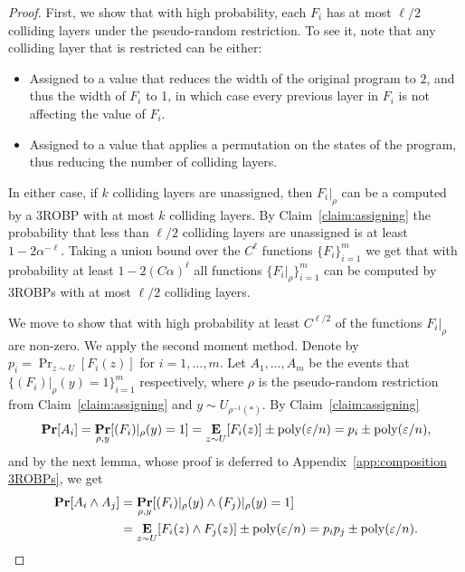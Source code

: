 \begin{proof}
	First, we show that with high probability, each $F_i$ has at most $\ell/2$ colliding layers under the pseudo-random restriction. 
	To see it, note that any colliding layer that is restricted can be either:
	\begin{itemize}
		\item Assigned to a value that reduces the width of the original program to $2$, and thus the width of $F_i$ to 1, in which case every previous layer in $F_i$ is not affecting the value of $F_i$.
		\item Assigned to a value that applies a permutation on the states of the program, thus reducing the number of colliding layers.
	\end{itemize}  
	In either case, if $k$ colliding layers are unassigned, then $F_i|_{\rho}$ can be a computed by a 3ROBP with at most $k$ colliding layers.
	By Claim~\ref{claim:assigning} the probability that less than $\ell/2$ colliding layers are unassigned is at least $1- 2 \alpha^{-\ell}$.
	Taking a union bound over the $C^{\ell}$ functions $\{F_i\}_{i=1}^{m}$ we get that with probability at least $1-2 (C \alpha)^{\ell}$ all functions $\{F_i|_{\rho}\}_{i=1}^{m}$ can be computed by 3ROBPs with at most $\ell/2$ colliding layers.
	
	We move to show that with high probability at least $C^{\ell/2}$ of the functions $F_i|_{\rho}$ are non-zero.
	We apply the second moment method. 
	Denote by $p_i = \Pr_{z\sim U}[F_i(z)]$ for $i=1, \ldots, m$.
	Let $A_1, \ldots, A_m$ be the events that $\{(F_i)|_{\rho}(y) =1\}_{i=1}^{m}$ respectively, where $\rho$ is the pseudo-random restriction from Claim~\ref{claim:assigning} and $y \sim U_{\rho^{-1}(*)}$.
	By Claim~\ref{claim:assigning}
	$$\mathop{\bf Pr\/}[A_i] = \mathop{\bf Pr\/}_{\rho,y}[(F_i)|_{\rho}(y) =1] = \mathop{\bf E\/}_{z\sim U}[F_i(z)] \pm {\mathrm{poly}}(\varepsilon/n) = p_i \pm {\mathrm{poly}}(\varepsilon/n),$$
	and by the next lemma, whose proof is deferred to Appendix~\ref{app:composition 3ROBPs}, we get
	\begin{align*}\mathop{\bf Pr\/}[A_i \wedge A_j] &= \mathop{\bf Pr\/}_{\rho,y}[(F_i)|_{\rho}(y) \wedge (F_j)|_{\rho}(y) =1]\\
	&= \mathop{\bf E\/}_{z\sim U}[F_i(z)\wedge F_j(z)] \pm {\mathrm{poly}}(\varepsilon/n) = p_i p_j \pm {\mathrm{poly}}(\varepsilon/n).
	\end{align*}	


\end{proof}
